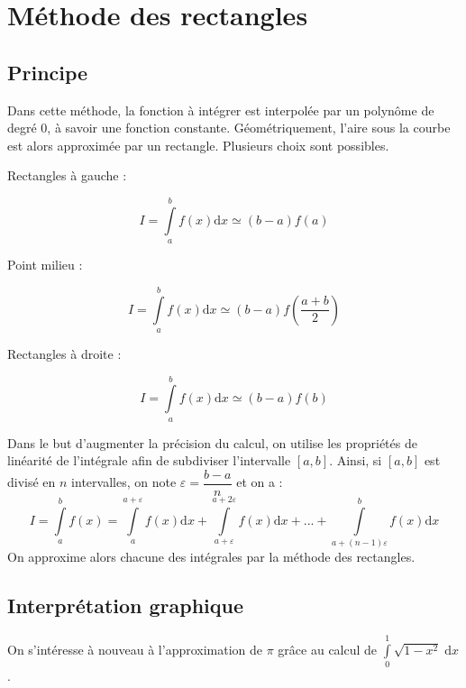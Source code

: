 \documentclass[10pt]{article}
\begin{document}
\section{Méthode des rectangles}
\subsection{Principe}
\begin{defi}
Dans cette méthode, la fonction à intégrer est interpolée par un polynôme de degré 0, à savoir une fonction constante. Géométriquement, l'aire sous la courbe est alors approximée par un rectangle. Plusieurs choix sont possibles.

\begin{minipage}[c]{.3\linewidth}
Rectangles à gauche :

$$
I = \int\limits_a^{b} f(x) \mathrm{d}x \simeq \left(b-a\right) f(a) 
$$
\end{minipage}\hfill
\begin{minipage}[c]{.3\linewidth}
Point milieu :

$$
I = \int\limits_a^{b} f(x) \mathrm{d}x \simeq \left(b-a\right) f\left(\dfrac{a+b}{2}\right) 
$$
\end{minipage}\hfill
\begin{minipage}[c]{.3\linewidth}
Rectangles à droite :

$$
I = \int\limits_a^{b} f(x) \mathrm{d}x \simeq \left(b-a\right) f(b) 
$$
\end{minipage}

\end{defi}

\begin{rem}
Dans le but d'augmenter la précision du calcul, on utilise les propriétés de linéarité de l'intégrale afin de subdiviser l'intervalle $[a,b]$. Ainsi, si $[a,b]$ est divisé en $n$ intervalles, on note $\varepsilon=\dfrac{b-a}{n}$ et on a :  
$$
I= \int\limits_a^{b} f(x) = \int\limits_{a}^{a+\varepsilon} f(x) \mathrm{d}x + \int\limits_{a+\varepsilon}^{a+2\varepsilon} f(x) \mathrm{d}x + ... + \int\limits_{a+(n-1)\varepsilon}^{b} f(x) \mathrm{d}x
$$
On approxime alors chacune des intégrales par la méthode des rectangles.
\end{rem}
\subsection{Interprétation graphique}

On s'intéresse à nouveau à l'approximation de $\pi$ grâce au calcul de $\int\limits_0^{1}\sqrt{1-x^2}\;\mathrm{d}x$ .
\end{document}
